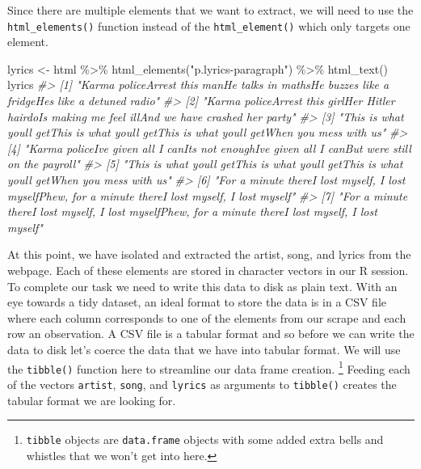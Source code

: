 \documentclass[
]{article}
\newenvironment{Shaded}{\begin{snugshade}}{\end{snugshade}}
\newcommand{\CommentTok}[1]{\textcolor[rgb]{0.56,0.35,0.01}{\textit{#1}}}
\newcommand{\FunctionTok}[1]{\textcolor[rgb]{0.00,0.00,0.00}{#1}}
\newcommand{\NormalTok}[1]{#1}
\newcommand{\OtherTok}[1]{\textcolor[rgb]{0.56,0.35,0.01}{#1}}
\newcommand{\SpecialCharTok}[1]{\textcolor[rgb]{0.00,0.00,0.00}{#1}}
\newcommand{\StringTok}[1]{\textcolor[rgb]{0.31,0.60,0.02}{#1}}
\begin{document}
Since there are multiple elements that we want to extract, we will need to use the \texttt{html\_elements()} function instead of the \texttt{html\_element()} which only targets one element.

\begin{Shaded}
\begin{Highlighting}[]
\NormalTok{lyrics }\OtherTok{\textless{}{-}}\NormalTok{ html }\SpecialCharTok{\%\textgreater{}\%}
    \FunctionTok{html\_elements}\NormalTok{(}\StringTok{"p.lyrics{-}paragraph"}\NormalTok{) }\SpecialCharTok{\%\textgreater{}\%}
    \FunctionTok{html\_text}\NormalTok{()}
\NormalTok{lyrics}
\CommentTok{\#\textgreater{} [1] "Karma policeArrest this manHe talks in mathsHe buzzes like a fridgeHe\textquotesingle{}s like a detuned radio"      }
\CommentTok{\#\textgreater{} [2] "Karma policeArrest this girlHer Hitler hairdoIs making me feel illAnd we have crashed her party"   }
\CommentTok{\#\textgreater{} [3] "This is what you\textquotesingle{}ll getThis is what you\textquotesingle{}ll getThis is what you\textquotesingle{}ll getWhen you mess with us"        }
\CommentTok{\#\textgreater{} [4] "Karma policeI\textquotesingle{}ve given all I canIt\textquotesingle{}s not enoughI\textquotesingle{}ve given all I canBut we\textquotesingle{}re still on the payroll" }
\CommentTok{\#\textgreater{} [5] "This is what you\textquotesingle{}ll getThis is what you\textquotesingle{}ll getThis is what you\textquotesingle{}ll getWhen you mess with us"        }
\CommentTok{\#\textgreater{} [6] "For a minute thereI lost myself, I lost myselfPhew, for a minute thereI lost myself, I lost myself"}
\CommentTok{\#\textgreater{} [7] "For a minute thereI lost myself, I lost myselfPhew, for a minute thereI lost myself, I lost myself"}
\end{Highlighting}
\end{Shaded}

At this point, we have isolated and extracted the artist, song, and lyrics from the webpage. Each of these elements are stored in character vectors in our R session. To complete our task we need to write this data to disk as plain text. With an eye towards a tidy dataset, an ideal format to store the data is in a CSV file where each column corresponds to one of the elements from our scrape and each row an observation. A CSV file is a tabular format and so before we can write the data to disk let's coerce the data that we have into tabular format. We will use the \texttt{tibble()} function here to streamline our data frame creation. \footnote{\texttt{tibble} objects are \texttt{data.frame} objects with some added extra bells and whistles that we won't get into here.} Feeding each of the vectors \texttt{artist}, \texttt{song}, and \texttt{lyrics} as arguments to \texttt{tibble()} creates the tabular format we are looking for.
\end{document}
